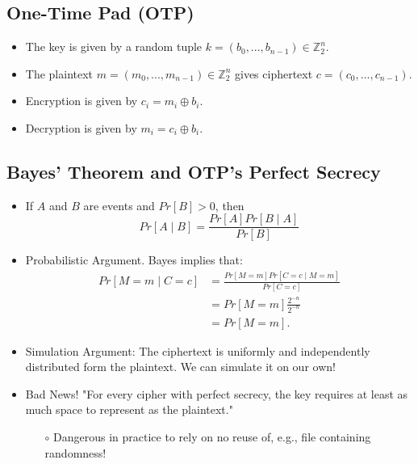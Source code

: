 \documentclass[a4paper]{scrartcl}
\begin{document}
\subsection*{One-Time Pad (OTP)}
\begin{itemize}
\item The key is given by a random tuple $k = (b_0, ..., b_{n-1}) \in \mathbb{Z}_{2}^{n}$.
\item The plaintext $m = (m_0, ..., m_{n-1}) \in \mathbb{Z}_{2}^{n}$ gives ciphertext $c = (c_0, ..., c_{n-1})$.
\item Encryption is given by $c_i = m_i \oplus b_i$.
\item Decryption is given by $m_i = c_i \oplus b_i$.
\end{itemize}

\subsection*{Bayes' Theorem and OTP's Perfect Secrecy}
\begin{itemize}
\item If $A$ and $B$ are events and $Pr[B] > 0$, then $$Pr[A \mid B] = \frac{Pr[A]Pr[B \mid A]}{Pr[B]}$$
\item Probabilistic Argument. Bayes implies that:
\begin{align*}
Pr[M = m \mid C = c] &= \frac{Pr[M = m]Pr[C = c \mid M = m]}{Pr[C=c]}\\
&=Pr[M = m]\frac{2^{-n}}{2^{-n}}\\
&=Pr[M=m].
\end{align*}
\item Simulation Argument: The ciphertext is uniformly and independently distributed form the plaintext. We can simulate it on our own!
\item Bad News! "For every cipher with perfect secrecy, the key requires at least as much space to represent as the plaintext."
\begin{itemize}
\item [$\circ$] Dangerous in practice to rely on no reuse of, e.g., file containing randomness!
\end{itemize}
\end{itemize}
\end{document}
